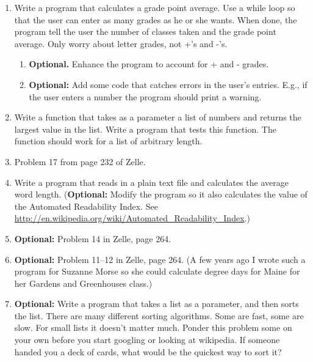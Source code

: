 \documentclass[12pt]{article}
\begin{document}
\begin{enumerate}

  \item Write a program that calculates a grade point average.  Use a
    while loop so that the user can enter as many grades as he or she
    wants.  When done, the program tell the user the number of classes
    taken and the grade point average.  Only worry about letter
    grades, not +'s and -'s. 
\begin{enumerate}
    \item {\bf Optional.}  Enhance the program to account for + and -
      grades. 
    \item {\bf Optional:}  Add some code that catches errors in the
      user's entries.  E.g., if the user enters a number the program
      should print a warning.
\end{enumerate}  

  \item Write a function that takes as a parameter a list of numbers
    and returns the largest value in the list.  Write a program that
    tests this function.  The function should work for a list of
    arbitrary length.

  \item Problem 17 from page 232 of Zelle.

  \item Write a program that reads in a plain text file and calculates
    the average word length.  ({\bf Optional:}  Modify the program so
    it also calculates the value of the Automated Readability Index.
    See
    \url{http://en.wikipedia.org/wiki/Automated_Readability_Index}.) 

  \item {\bf Optional:}  Problem 14 in Zelle, page 264. 

  \item {\bf Optional:}  Problem 11--12 in Zelle, page 264. (A few
    years ago I wrote such a program for Suzanne Morse so she could
    calculate degree days for Maine for her Gardens and Greenhouses
    class.) 

  \item {\bf Optional:}  Write a program that takes a list as a
    parameter, and then sorts the list.  There are many different
    sorting algorithms.  Some are fast, some are slow.  For small
    lists it doesn't matter much.  Ponder this problem some on your
    own before you start googling or looking at wikipedia.  If someone
    handed you a deck of cards, what would be the quickest way to sort
    it?  

\end{enumerate}
\end{document}
